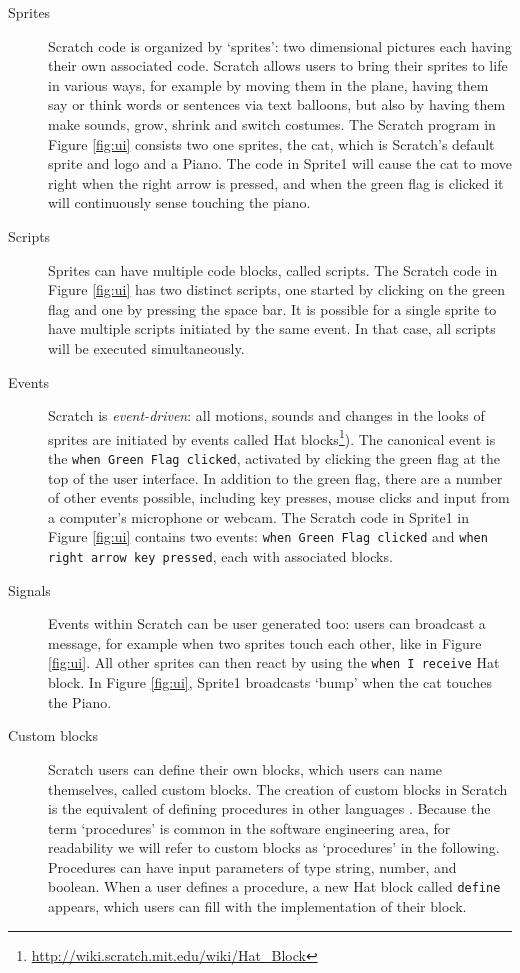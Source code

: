 \documentclass{sig-alternate}
\begin{document}
\begin{description}
	\item [Sprites] Scratch code is organized by `sprites': two dimensional pictures each having their own associated code. Scratch allows users to bring their sprites to life in various ways, for example by moving them in the plane, having them say or think words or sentences via text balloons, but also by having them make sounds, grow, shrink and switch costumes. The Scratch program in Figure \ref{fig:ui} consists two one sprites, the cat, which is Scratch's default sprite and logo and a Piano. The code in Sprite1 will cause the cat to move right when the right arrow is pressed, and when the green flag is clicked it will continuously sense touching the piano.
	\item [Scripts]Sprites can have multiple code blocks, called scripts. The Scratch code in Figure \ref{fig:ui} has two distinct scripts, one started by clicking on the green flag and one by pressing the space bar. It is possible for a single sprite to have multiple scripts initiated by the same event. In that case, all scripts will be executed simultaneously.
	\item [Events] Scratch is \emph{event-driven}: all motions, sounds and changes in the looks of sprites are initiated by events called Hat blocks\footnote{\url{http://wiki.scratch.mit.edu/wiki/Hat_Block}}). The canonical event is the \texttt{when Green Flag clicked}, activated by clicking the green flag at the top of the user interface. In addition to the green flag, there are a number of other events possible, including key presses, mouse clicks and input from a computer's microphone or webcam. The Scratch code in Sprite1 in Figure \ref{fig:ui} contains two events: \texttt{when Green Flag clicked} and \texttt{when right arrow key pressed}, each with associated blocks.
	\item [Signals] Events within Scratch can be user generated too: users can broadcast a message, for example when two sprites touch each other, like in Figure \ref{fig:ui}. All other sprites can then react by using the \texttt{when I receive} Hat block. In Figure \ref{fig:ui}, Sprite1 broadcasts `bump' when the cat touches the Piano. 
	\item[Custom blocks] Scratch users can define their own blocks, which users can name themselves, called custom blocks. The creation of custom blocks in Scratch is the equivalent of defining procedures in other languages \cite{moreno_automatic_2014}. Because the term `procedures' is common in the software engineering area, for readability we will refer to custom blocks as `procedures' in the following. Procedures can have input parameters of type string, number, and boolean. When a user defines a procedure, a new Hat block called \texttt{define} appears, which users can fill with the implementation of their block.
\end{description}
\end{document}
